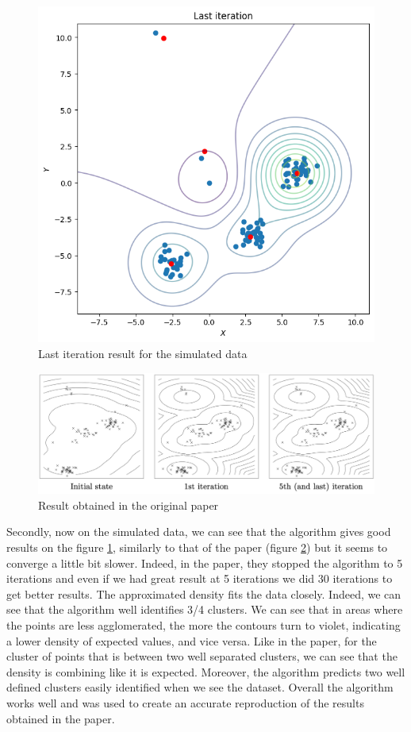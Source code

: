 \documentclass{article}
\begin{document}
\begin{figure}[H]
    \centering
    \includegraphics[scale=0.4]{images/sampled_last_iteration.png}
    \caption{Last iteration result for the simulated data}
    \label{fig:alg_last}
\end{figure}
\begin{figure}[H]
    \centering
    \includegraphics[scale=0.4]{images/paper_result.png}
    \caption{Result obtained in the original paper}
    \label{fig:alg_paper}
\end{figure}

Secondly, now on the simulated data, we can see that the algorithm gives good results on the figure \ref{fig:alg_last}, similarly to that of the paper (figure \ref{fig:alg_paper}) but it seems to converge a little bit slower. Indeed, in the paper, they stopped the algorithm to 5 iterations and even if we had great result at 5 iterations we did 30 iterations to get better results.
The approximated density fits the data closely. Indeed, we can see that the algorithm well identifies 3/4 clusters. We can see that in areas where the points are less agglomerated, the more the contours turn to violet, indicating a lower density of expected values, and vice versa. Like in the paper, for the cluster of points that is between two well separated clusters, we can see that the density is combining like it is expected. Moreover, the algorithm predicts two well defined clusters easily identified when we see the dataset. Overall the algorithm works well and was used to create an accurate reproduction of the results obtained in the paper.
\end{document}
